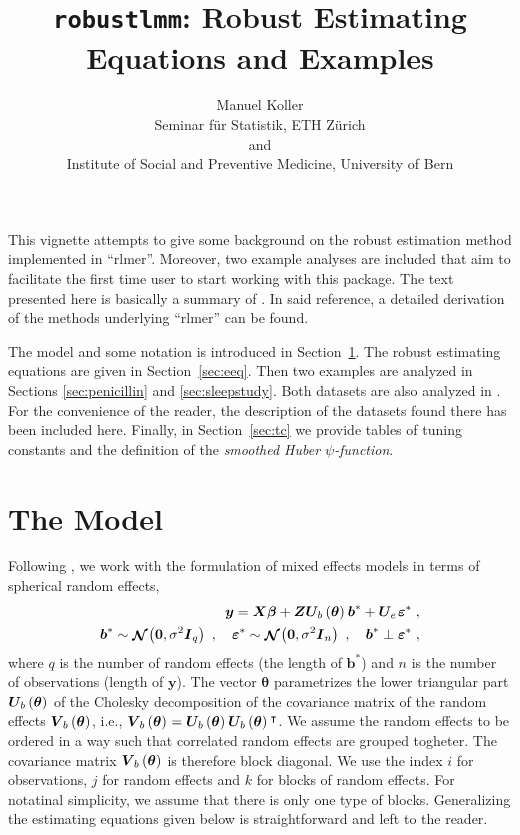 \documentclass[11pt, a4paper]{article}
\newcommand{\T}[1]      {\texttt{#1}}
\newcommand{\fn}[1]{\kern-1pt\left(#1\right)\kern+0.5pt}
\newcommand{\bld}[1]{\boldsymbol{#1}}
\renewcommand{\vec}[1]{\bld{#1}}
\newcommand{\vbs}{\vec b^{*}}
\newcommand{\ves}{\vec\varepsilon^{*}}
\newcommand{\U}[2][-0.15ex]{\bld{U}_{\hspace{#1}#2\hspace{0.25ex}}}
\newcommand{\V}[2][-0.15ex]{\bld{V}_{\hspace{#1}#2\hspace{0.25ex}}}
\newcommand{\Ue}{\U{e}}
\newcommand{\Ubth}{\U{b}\fn{\vec\theta}}
\newcommand{\Vbth}{\V{b}\fn{\vec\theta}}
\newcommand{\tr}{^{\intercal}}
\DeclareMathOperator{\N}{\mathcal{N}}
\theoremstyle{note}
\begin{document}
\author{Manuel Koller\\[1em]
  \small{Seminar f\"ur Statistik, ETH Z\"urich}\\
  \small{and}\\
  \small{Institute of Social and Preventive Medicine, University of Bern}}
\title{\T{robustlmm}: Robust Estimating Equations and Examples}
\maketitle

This vignette attempts to give some background on the robust estimation
method implemented in ``rlmer''. Moreover, two example analyses are
included that aim to facilitate the first time user to start working with
this package. The text presented here is basically a summary of
\citet{koller2013}. In said reference, a detailed derivation of the methods
underlying ``rlmer'' can be found.

The model and some notation is introduced in Section~\ref{sec:model}. The
robust estimating equations are given in Section~\ref{sec:eeq}. Then two
examples are analyzed in Sections \ref{sec:penicillin} and
\ref{sec:sleepstudy}. Both datasets are also analyzed in
\citet{bates2011lme4}. For the convenience of the reader, the description
of the datasets found there has been included here. Finally, in
Section~\ref{sec:tc} we provide tables of tuning constants and the
definition of the \emph{smoothed Huber $\psi$-function}.

\section{The Model}
\label{sec:model}
Following \citet{bates2011lme4}, we work with the formulation
of mixed effects models in terms of spherical random effects,
\begin{equation}
  \label{eq:mixedModelSpherical}
  \begin{split}
    \vec y = \bld X\vec\beta + \bld Z\Ubth\vbs + \Ue\ves\;, \\
    \vbs \sim \bld{\N}\fn{\vec 0, \sigma^2\bld I_q}\;, \quad
    \ves \sim \bld{\N}\fn{\vec 0, \sigma^2\bld I_n}\;, \quad
    \vbs \perp \ves\;,
  \end{split}
\end{equation}
where $q$ is the number of random effects (the length of $\vbs$) and $n$ is
the number of observations (length of $\vec y$). The vector $\vec\theta$
parametrizes the lower triangular part $\Ubth$ of the Cholesky
decomposition of the covariance matrix of the random effects $\Vbth$, i.e.,
$\Vbth = \Ubth\Ubth\tr$. We assume the random effects to be ordered in a
way such that correlated random effects are grouped togheter. The
covariance matrix $\Vbth$ is therefore block diagonal. We use the index $i$
for observations, $j$ for random effects and $k$ for blocks of random
effects. For notatinal simplicity, we assume that there is only one type of
blocks. Generalizing the estimating equations given below is
straightforward and left to the reader.
\end{document}
